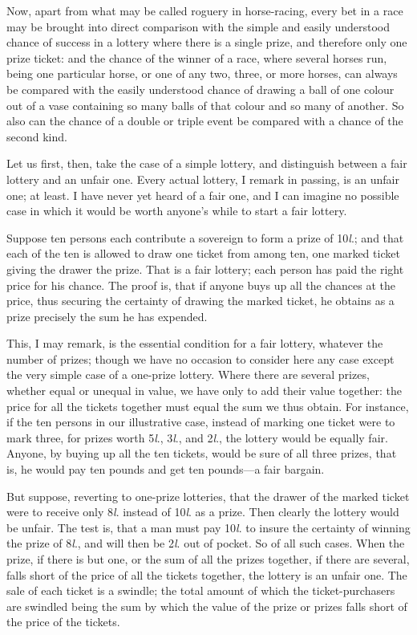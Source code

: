 \documentclass[letterpaper,12pt,oneside,openany]{memoir}
\begin{document}
Now, apart from what may be called roguery in
horse-racing, every bet in a race may be brought into
direct comparison with the simple and easily understood
chance of success in a lottery where there is a single
prize, and therefore only one prize ticket: and the
chance of the winner of a race, where several horses
run, being one particular horse, or one of any two, three,
or more horses, can always be compared with the easily
understood chance of drawing a ball of one colour out
of a vase containing so many balls of that colour and so
many of another. So also can the chance of a double
or triple event be compared with a chance of the second
kind.

Let us first, then, take the case of a simple lottery,
and distinguish between a fair lottery and an unfair
one. Every actual lottery, I remark in passing, is an
unfair one; at least. I have never yet heard of a fair
one, and I can imagine no possible case in which it
would be worth anyone's while to start a fair lottery.

Suppose ten persons each contribute a sovereign to
form a prize of 10\textit{l}.; and that each of the ten is allowed
to draw one ticket from among ten, one marked ticket
giving the drawer the prize. That is a fair lottery;
each person has paid the right price for his chance.
The proof is, that if anyone buys up all the chances at
the price, thus securing the certainty of drawing the
marked ticket, he obtains as a prize precisely the sum
he has expended.

This, I may remark, is the essential condition for a
fair lottery, whatever the number of prizes; though we
have no occasion to consider here any case except the
very simple case of a one-prize lottery. Where there
are several prizes, whether equal or unequal in value,
we have only to add their value together: the price for
all the tickets together must equal the sum we thus
obtain. For instance, if the ten persons in our illustrative
case, instead of marking one ticket were to mark
three, for prizes worth 5\textit{l}., 3\textit{l}., and 2\textit{l}., the lottery would
be equally fair. Anyone, by buying up all the ten
tickets, would be sure of all three prizes, that is, he
would pay ten pounds and get ten pounds---a fair
bargain.

But suppose, reverting to one-prize lotteries, that
the drawer of the marked ticket were to receive only 8\textit{l}.
instead of 10\textit{l}. as a prize. Then clearly the lottery
would be unfair. The test is, that a man must pay 10\textit{l}.
to insure the certainty of winning the prize of 8\textit{l}., and
will then be 2\textit{l}. out of pocket. So of all such cases.
When the prize, if there is but one, or the sum of all
the prizes together, if there are several, falls short of the
price of all the tickets together, the lottery is an unfair
one. The sale of each ticket is a swindle; the total
amount of which the ticket-purchasers are swindled
being the sum by which the value of the prize or prizes
falls short of the price of the tickets.
\end{document}
